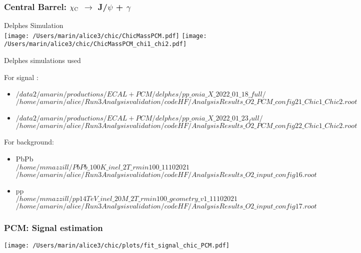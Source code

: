 \documentclass[final,hyperref={pdfpagelabels=false},aspectratio=169,t]{beamer}
\begin{document}
\begin{frame}
\frametitle{Central Barrel: $\chi_{\rm C}$ $\rightarrow$ J/$\psi$ + $\gamma$} 

Delphes Simulation\\


\centering
\texttt{[image: /Users/marin/alice3/chic/ChicMassPCM.pdf]}
\texttt{[image: /Users/marin/alice3/chic/ChicMassPCM\_chi1\_chi2.pdf]}

\end{frame}
\begin{frame}{Delphes simulations used}

{\tiny
For signal :\\
\begin{itemize}
\item $/data2/amarin/productions/ECAL+PCM/delphes/pp\_onia\_X\_2022\_01\_18\_full/$\\
$/home/amarin/alice/Run3Analysisvalidation/codeHF/AnalysisResults\_O2\_PCM\_config21\_Chic1\_Chic2.root$\\

\item $/data2/amarin/productions/ECAL+PCM/delphes/pp\_onia\_X\_2022\_01\_23_full/$\\
$/home/amarin/alice/Run3Analysisvalidation/codeHF/AnalysisResults\_O2\_PCM\_config22\_Chic1\_Chic2.root$
\end{itemize}


For background:
\begin{itemize}
\item PbPb\\
$/home/mmazzill/PbPb\_100K\_inel\_2T\_rmin100\_11102021$\\
$/home/amarin/alice/Run3Analysisvalidation/codeHF/AnalysisResults\_O2\_input\_config16.root$
\item pp\\
$/home/mmazzill/pp14TeV\_inel\_20M\_2T\_rmin100\_geometry\_v1\_11102021$\\
$/home/amarin/alice/Run3Analysisvalidation/codeHF/AnalysisResults\_O2\_input\_config17.root$
\end{itemize}
}
\end{frame}

\begin{frame}
\frametitle{PCM: Signal  estimation} 
\centering

\texttt{[image: /Users/marin/alice3/chic/plots/fit\_signal\_chic\_PCM.pdf]}\\
\end{frame}
\end{document}
